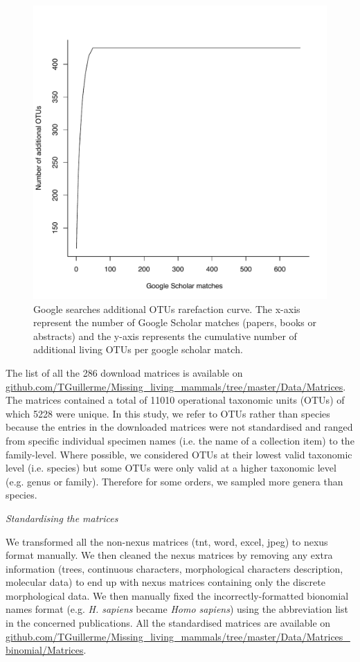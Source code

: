 \documentclass[12pt,letterpaper]{article}
\renewcommand{\subsection}[1]{%
\bigskip
\begin{center}
\begin{large}
\normalfont\itshape #1
\end{large}
\end{center}}
\begin{document}
\begin{figure}[!htbp]
\centering
    \includegraphics[width=1\textwidth]{Supp_figure_google_searches.pdf}
\caption{Google searches additional OTUs rarefaction curve. The x-axis represent the number of Google Scholar matches (papers, books or abstracts) and the y-axis represents the cumulative number of additional living OTUs per google scholar match.}
\label{Supp_figure_google_searches}
\end{figure}

The list of all the 286 download matrices is available on \url{github.com/TGuillerme/Missing_living_mammals/tree/master/Data/Matrices}.
The matrices contained a total of 11010 operational taxonomic units (OTUs) of which 5228 were unique.
In this study, we refer to OTUs rather than species because the entries in the downloaded matrices were not standardised and ranged from specific individual specimen names (i.e. the name of a collection item) to the family-level.
Where possible, we considered OTUs at their lowest valid taxonomic level (i.e. species) but some OTUs were only valid at a higher taxonomic level (e.g. genus or family).
Therefore for some orders, we sampled more genera than species.

\subsection{Standardising the matrices}
We transformed all the non-nexus matrices (tnt, word, excel, jpeg) to nexus format manually.
We then cleaned the nexus matrices by removing any extra information (trees, continuous characters, morphological characters description, molecular data) to end up with nexus matrices containing only the discrete morphological data.
We then manually fixed the incorrectly-formatted bionomial names format (e.g. \textit{H. sapiens} became \textit{Homo sapiens}) using the abbreviation list in the concerned publications. 
All the standardised matrices are available on \url{github.com/TGuillerme/Missing_living_mammals/tree/master/Data/Matrices_binomial/Matrices}.
\end{document}
